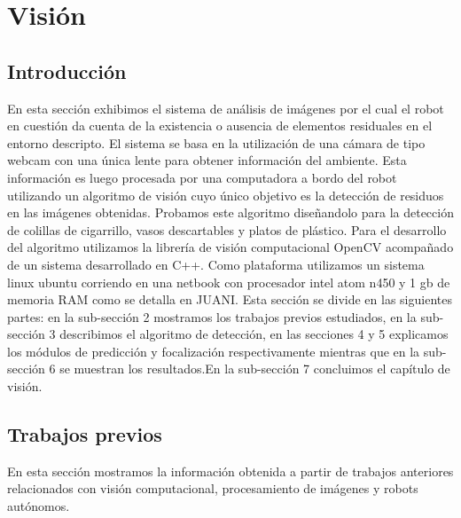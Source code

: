 ﻿\section{Visi\'on}

\subsection{Introducción}
En esta sección exhibimos el sistema de análisis de imágenes por 
el cual el robot en cuestión da cuenta de la existencia o ausencia de 
elementos residuales en el entorno descripto. El sistema se basa en la 
utilización de una cámara de tipo webcam con una única lente para 
obtener información del ambiente. Esta información es luego procesada 
por una computadora a bordo del robot utilizando un algoritmo de visión 
cuyo único objetivo es la detección de residuos 
en las imágenes obtenidas. Probamos este algoritmo diseñandolo para la detección de 
colillas de cigarrillo, vasos descartables y platos de plástico. Para 
el desarrollo del algoritmo utilizamos la librería de visión 
computacional OpenCV \cite{opencv_library} acompañado de un sistema 
desarrollado en C++. Como plataforma utilizamos un sistema linux 
ubuntu corriendo en una netbook con procesador intel atom 
n450 y 1 gb de memoria RAM como se detalla en JUANI.
Esta sección se divide en las siguientes partes: en la sub-sección 2 mostramos  
los trabajos previos estudiados, en la sub-sección 3 describimos el algoritmo de detección, 
en las secciones 4 y 5 explicamos los módulos de predicción y focalización respectivamente mientras que en la 
sub-sección 6 se muestran los resultados.En la sub-sección 7 concluimos 
el capítulo de visión.

\subsection{Trabajos previos}
En esta sección mostramos la información obtenida a partir de 
trabajos anteriores relacionados con visión computacional, 
procesamiento de imágenes y robots autónomos.
 
